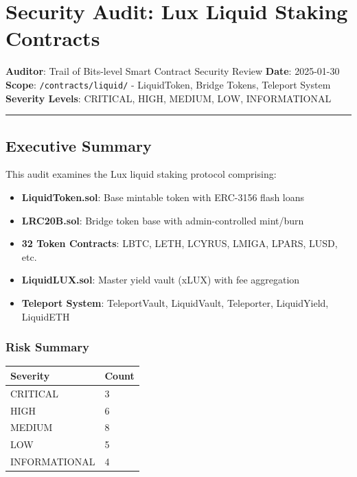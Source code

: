 \documentclass[
]{article}
\author{}
\date{}
\newcounter{none} %
\providecommand{\tightlist}{%
  \setlength{\itemsep}{0pt}\setlength{\parskip}{0pt}}
\begin{document}
\section{Security Audit: Lux Liquid Staking
Contracts}\label{security-audit-lux-liquid-staking-contracts}

\textbf{Auditor}: Trail of Bits-level Smart Contract Security Review
\textbf{Date}: 2025-01-30 \textbf{Scope}: \texttt{/contracts/liquid/} -
LiquidToken, Bridge Tokens, Teleport System \textbf{Severity Levels}:
CRITICAL, HIGH, MEDIUM, LOW, INFORMATIONAL

\begin{center}\rule{0.5\linewidth}{0.5pt}\end{center}

\subsection{Executive Summary}\label{executive-summary}

This audit examines the Lux liquid staking protocol comprising:

\begin{itemize}
\tightlist
\item
  \textbf{LiquidToken.sol}: Base mintable token with ERC-3156 flash
  loans
\item
  \textbf{LRC20B.sol}: Bridge token base with admin-controlled mint/burn
\item
  \textbf{32 Token Contracts}: LBTC, LETH, LCYRUS, LMIGA, LPARS, LUSD,
  etc.
\item
  \textbf{LiquidLUX.sol}: Master yield vault (xLUX) with fee aggregation
\item
  \textbf{Teleport System}: TeleportVault, LiquidVault, Teleporter,
  LiquidYield, LiquidETH
\end{itemize}

\subsubsection{Risk Summary}\label{risk-summary}

{\def\LTcaptype{none} %
\begin{longtable}[]{@{}ll@{}}
\toprule\noalign{}
Severity & Count \\
\midrule\noalign{}
\endhead
\bottomrule\noalign{}
\endlastfoot
CRITICAL & 3 \\
HIGH & 6 \\
MEDIUM & 8 \\
LOW & 5 \\
INFORMATIONAL & 4 \\
\end{longtable}
}
\end{document}
